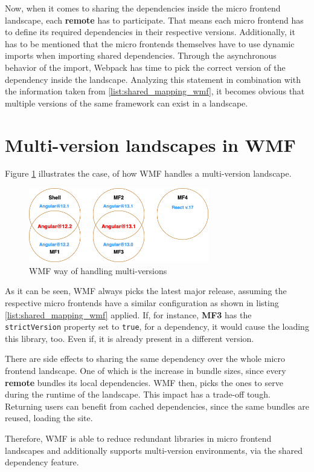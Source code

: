 Now, when it comes to sharing the dependencies inside the micro frontend landscape, each \textbf{remote} has to participate. That means each micro frontend has to define its required dependencies in their respective versions. Additionally, it has to be mentioned that the micro frontends themselves have to use dynamic imports when importing shared dependencies. Through the asynchronous behavior of the import, Webpack has time to pick the correct version of the dependency inside the landscape.\cite{wmf_concepts}
Analyzing this statement in combination with the information taken from \ref{list:shared_mapping_wmf}, it becomes obvious that multiple versions of the same framework can exist in a landscape. 

\section{Multi-version landscapes in WMF}

Figure \ref{fig:wmf_multiversions} illustrates the case, of how WMF handles a multi-version landscape.

\begin{figure}[!h]
	\centering
	\includegraphics[width=0.7\textwidth]{Figures/multi_version_diagramm.drawio.png}
	\caption{WMF way of handling multi-versions}
	\label{fig:wmf_multiversions}
\end{figure}

As it can be seen, WMF always picks the latest major release, assuming the respective micro frontends have a similar configuration as shown in listing \ref{list:shared_mapping_wmf} applied. If, for instance, \textbf{MF3} has the \texttt{strictVersion} property set to \texttt{true}, for a dependency, it would cause the loading this library, too. Even if, it is already present in a different version.

There are side effects to sharing the same dependency over the whole micro frontend landscape. One of which is the increase in bundle sizes, since every \textbf{remote} bundles its local dependencies. WMF then, picks the ones to serve during the runtime of the landscape.
This impact has a trade-off tough. Returning users can benefit from cached dependencies, since the same bundles are reused, loading the site.\cite{wmf_multi_versions}

Therefore, WMF is able to reduce redundant libraries in micro frontend landscapes and additionally supports multi-version environments, via the shared dependency feature.